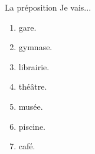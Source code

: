 \documentclass{beamer}
\begin{document}
  \begin{frame}{La préposition }
    Je vais...
    \begin{enumerate}
      \item \underline{} gare.
      \item \underline{} gymnase.
      \item \underline{} librairie.
      \item \underline{\uncover<->{au}} théâtre.
      \item \underline{} musée.
      \item \underline{} piscine.
      \item \underline{} café.
    \end{enumerate}
  \end{frame}
\end{document}
